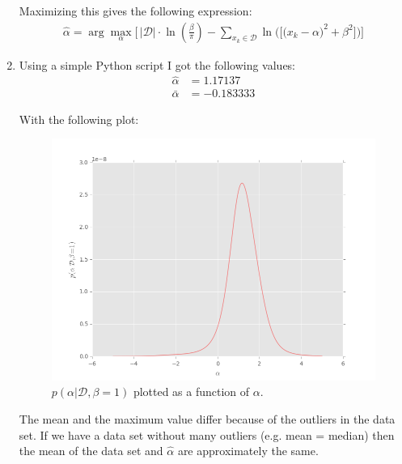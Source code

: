 \documentclass[paper=a4, fontsize=10pt]{scrartcl} %
\numberwithin{equation}{section} %
\numberwithin{figure}{section} %
\numberwithin{table}{section} %
\begin{document}
\begin{enumerate}
			Maximizing this gives the following expression:
			\begin{align}
				\hat \alpha = \arg\max_\alpha \bigg[ \, \vert \mathcal{D} \vert \cdot \ln(\frac{\beta}{\pi}) - \sum_{x_k \in \mathcal{D}} \ln\big(\big[\big(x_k - \alpha\big)^2 + \beta^2\big]\big) \bigg]
			\end{align}
	\item
			Using a simple Python script I got the following values:
				\begin{align}
					\hat\alpha &= 1.17137\\
					\bar\alpha &= -0.183333
				\end{align}

			With the following plot:

			\begin{figure}[ht!]
				\centering
				\includegraphics[scale=0.55]{exercise_214.png}
				\caption{$p(\alpha \vert \mathcal{D}, \beta = 1)$ plotted as a function of $\alpha$.}
			\end{figure}

			The mean and the maximum value differ because of the outliers in the data set. If we have a data set without many outliers (e.g. mean = median) then the mean of the data set and $\hat\alpha$ are approximately the same.
\end{enumerate}
\end{document}
